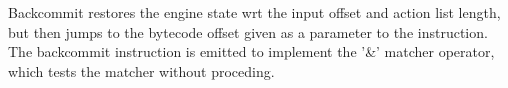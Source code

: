 Backcommit restores the engine state wrt the input offset and
action list length, but then jumps to the bytecode offset given
as a parameter to the instruction. The backcommit instruction
is emitted to implement the '\&' matcher operator, which tests
the matcher without proceding.
